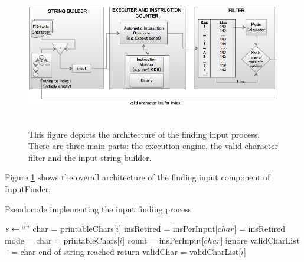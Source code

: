\documentclass{acm_proc_article-sp}
\def \tool {InputFinder}
\begin{document}
\begin{figure}[t]
\centering
\includegraphics[height=2.5in,width=6.5in]{architecture.png}
\caption{This figure depicts the architecture of the finding input process. There are three main parts: the execution engine, the valid character filter and the input string builder.}
\label{fig:architecture}
\end{figure}

Figure \ref{fig:architecture} shows the overall architecture of the finding input component of \tool{}.

\begin{algorithm}
\caption{Pseudocode implementing the input finding process}
\label{findinputcode}
\begin{algorithmic}[1]
\State $s \leftarrow ``"$ 
\State char = printableChars[$i$]
\State insRetired =  \label{execute}%
\State insPerInput[$char$] = insRetired %
\EndFor
\State mode =  \label{mode}%
 \label{filterbegin}%
\State char = printableChars[$i$]
\State count = insPerInput[$char$]
\State ignore
\Else
\State validCharList += char
\EndIf
\EndFor \label{filterend}
\State end of string reached
\State return
\Else
{} \label{fork}
\State validChar = validCharList[$i$]
\State {}
\EndFor
\EndIf
\EndProcedure
\end{algorithmic}
\end{algorithm}
\end{document}
